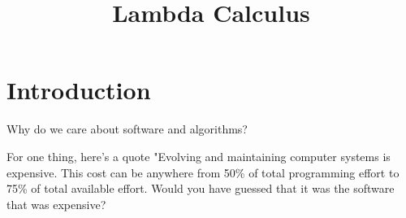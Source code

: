 \documentclass{article}
\title{Lambda Calculus}
\date{}
\begin{document}
\maketitle

\section{Introduction}

Why do we care about software and algorithms?

For one thing, here's a quote "Evolving and maintaining computer systems is expensive. This cost can be anywhere from 50\% of total programming effort to 75\% of total available effort. Would you have guessed that it was the software that was expensive?
\end{document}
